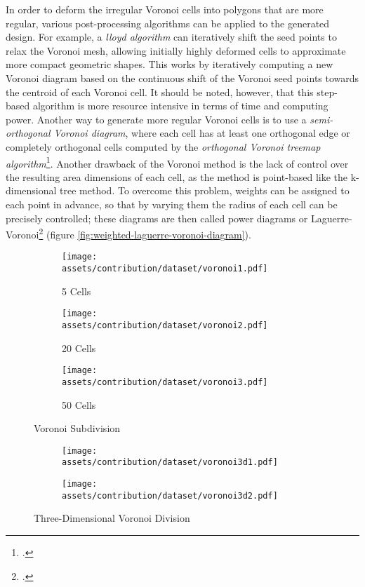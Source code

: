 \documentclass[a4paper, 12pt]{report}
\begin{document}
In order to deform the irregular Voronoi cells into polygons that are more regular, various post-processing algorithms can be applied to the generated design. For example, a \textit{\Gls{lloyd algorithm}} can iteratively shift the seed points to relax the Voronoi mesh, allowing initially highly deformed cells to approximate more compact geometric shapes. This works by iteratively computing a new Voronoi diagram based on the continuous shift of the Voronoi seed points towards the \gls{centroid} of each Voronoi cell. It should be noted, however, that this step-based algorithm is more resource intensive in terms of time and computing power. Another way to generate more regular Voronoi cells is to use a \textit{semi-orthogonal Voronoi diagram}, where each cell has at least one orthogonal edge or completely orthogonal cells computed by the \textit{orthogonal Voronoi treemap algorithm}\footcites{wang2019orthogonal}{chatzikonstantinou20143}. Another drawback of the Voronoi method is the lack of control over the resulting area dimensions of each cell, as the method is point-based like the k-dimensional tree method. To overcome this problem, weights can be assigned to each point in advance, so that by varying them the radius of each cell can be precisely controlled; these diagrams are then called power diagrams or Laguerre-Voronoi\footcite{anuradha2008voronoi} (figure \ref{fig:weighted-laguerre-voronoi-diagram}).

\begin{figure}
\centering
\begin{subfigure}{.33\textwidth}
\centering
\texttt{[image: assets/contribution/dataset/voronoi1.pdf]}
\caption{5 Cells}
\label{fig:5-cells}
\end{subfigure}%
\begin{subfigure}{.33\textwidth}
\centering
\texttt{[image: assets/contribution/dataset/voronoi2.pdf]}
\caption{20 Cells}
\label{fig:20-cells}
\end{subfigure}%
\begin{subfigure}{.33\textwidth}
\centering
\texttt{[image: assets/contribution/dataset/voronoi3.pdf]}
\caption{50 Cells}
\label{fig:50-cells}
\end{subfigure}
\caption{Voronoi Subdivision}
\label{fig:voronoi-subdivision}
\end{figure}

\begin{figure}
\centering
\begin{subfigure}{.5\textwidth}
\centering
\texttt{[image: assets/contribution/dataset/voronoi3d1.pdf]}
\label{fig:3d-voronoi-1}
\end{subfigure}%
\begin{subfigure}{.5\textwidth}
\centering
\texttt{[image: assets/contribution/dataset/voronoi3d2.pdf]}
\label{fig:3d-voronoi-2}
\end{subfigure}
\caption{Three-Dimensional Voronoi Division}
\label{fig:three-dimensional-voronoi-division}
\end{figure}
\end{document}
